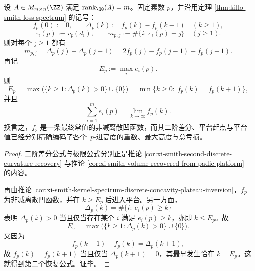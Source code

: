 \begin{corollary}\label{cor:xi-smith-loss-spectrum-plateau-start-total-loss}
设 \(A\in M_{m\times n}(\ZZ)\) 满足 \(\operatorname{rank}_{\QQ}(A)=m\)。固定素数 \(p\)，并沿用定理 \ref{thm:killo-smith-loss-spectrum} 的记号：
\[
f_p(0):=0,\qquad
\Delta_p(k):=f_p(k)-f_p(k-1)\quad(k\ge 1),
\]
\[
e_i(p):=v_p(d_i),\qquad
m_{p,j}:=\#\{i:\ e_i(p)=j\}\quad(j\ge 1).
\]
则对每个 \(j\ge 1\) 都有
\[
m_{p,j}
=
\Delta_p(j)-\Delta_p(j+1)
=
2f_p(j)-f_p(j-1)-f_p(j+1).
\]
再记
\[
E_p:=\max_i e_i(p).
\]
则
\[
E_p
=
\max\bigl(\{k\ge 1:\Delta_p(k)>0\}\cup\{0\}\bigr)
=
\min\{k\ge 0:\ f_p(k)=f_p(k+1)\},
\]
并且
\[
\sum_{i=1}^{m}e_i(p)=\lim_{k\to\infty}f_p(k).
\]
换言之，\(f_p\) 是一条最终常值的非减离散凹函数，而其二阶差分、平台起点与平台值已经分别精确编码了各个 \(\,p\)-进高度的重数、最大高度与总亏损。
\end{corollary}
\begin{proof}
二阶差分公式与极限公式分别正是推论 \ref{cor:xi-smith-second-discrete-curvature-recovery} 与推论 \ref{cor:xi-smith-volume-recovered-from-padic-platform} 的内容。

再由推论 \ref{cor:xi-smith-kernel-spectrum-discrete-concavity-plateau-inversion}，\(f_p\) 为非减离散凹函数，并在 \(k\ge E_p\) 后进入平台。另一方面，
\[
\Delta_p(k)=\#\{i:\ e_i(p)\ge k\}
\]
表明 \(\Delta_p(k)>0\) 当且仅当存在某个 \(i\) 满足 \(e_i(p)\ge k\)，亦即 \(k\le E_p\)。故
\[
E_p=\max\bigl(\{k\ge 1:\Delta_p(k)>0\}\cup\{0\}\bigr).
\]
又因为
\[
f_p(k+1)-f_p(k)=\Delta_p(k+1),
\]
故 \(f_p(k)=f_p(k+1)\) 当且仅当 \(\Delta_p(k+1)=0\)，其最早发生恰在 \(k=E_p\)。这就得到第二个恢复公式。证毕。
\end{proof}

